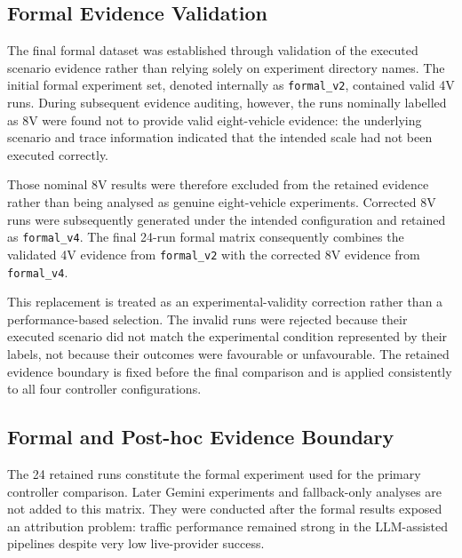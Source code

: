 \documentclass[letterpaper,10pt,conference]{ieeeconf}
\begin{document}
\subsection{Formal Evidence Validation}



The final formal dataset was established through validation of the executed scenario evidence rather than relying solely on experiment directory names. The initial formal experiment set, denoted internally as \texttt{formal\_v2}, contained valid 4V runs. During subsequent evidence auditing, however, the runs nominally labelled as 8V were found not to provide valid eight-vehicle evidence: the underlying scenario and trace information indicated that the intended scale had not been executed correctly.



Those nominal 8V results were therefore excluded from the retained evidence rather than being analysed as genuine eight-vehicle experiments. Corrected 8V runs were subsequently generated under the intended configuration and retained as \texttt{formal\_v4}. The final 24-run formal matrix consequently combines the validated 4V evidence from \texttt{formal\_v2} with the corrected 8V evidence from \texttt{formal\_v4}.



This replacement is treated as an experimental-validity correction rather than a performance-based selection. The invalid runs were rejected because their executed scenario did not match the experimental condition represented by their labels, not because their outcomes were favourable or unfavourable. The retained evidence boundary is fixed before the final comparison and is applied consistently to all four controller configurations.



\subsection{Formal and Post-hoc Evidence Boundary}



The 24 retained runs constitute the formal experiment used for the primary controller comparison. Later Gemini experiments and fallback-only analyses are not added to this matrix. They were conducted after the formal results exposed an attribution problem: traffic performance remained strong in the LLM-assisted pipelines despite very low live-provider success.
\end{document}
